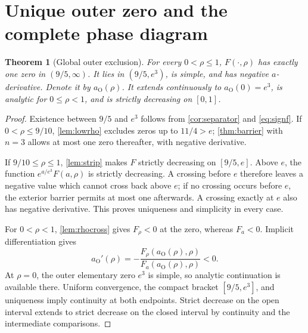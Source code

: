 \documentclass[11pt]{article}
\numberwithin{equation}{section}
\newtheorem{theorem}{Theorem}[section]
\theoremstyle{definition}
\newcommand{\aO}{a_{\mathrm O}}
\begin{document}
\section{Unique outer zero and the complete phase diagram}
\label{sec:phase}

\begin{theorem}[Global outer exclusion]\label{thm:outer}
For every $0<\rho\leq1$, $F(\cdot,\rho)$ has exactly one zero in
$(9/5,\infty)$. It lies in $(9/5,e^3)$, is simple, and has negative
$a$-derivative. Denote it by $\aO(\rho)$.
It extends continuously to $\aO(0)=e^3$, is analytic for $0\leq\rho<1$,
and is strictly decreasing on $[0,1]$.
\end{theorem}
\begin{proof}
Existence between $9/5$ and $e^3$ follows from \cref{cor:separator} and
\eqref{eq:signf}. If $0<\rho\leq9/10$, \cref{lem:lowrho} excludes zeros
up to $11/4>e$; \cref{thm:barrier} with $n=3$ allows at most one zero
thereafter, with negative derivative.

If $9/10\leq\rho\leq1$, \cref{lem:strip} makes $F$ strictly decreasing
on $[9/5,e]$. Above $e$, the function $e^{a/e^3}F(a,\rho)$ is strictly
decreasing. A crossing before $e$ therefore leaves a negative value
which cannot cross back above $e$; if no crossing occurs before $e$,
the exterior barrier permits at most one afterwards. A crossing exactly
at $e$ also has negative derivative. This proves uniqueness and simplicity
in every case.

For $0<\rho<1$, \cref{lem:rhocross} gives $F_\rho<0$ at the zero,
whereas $F_a<0$. Implicit differentiation gives
\begin{equation}\label{eq:outervelocity}
 \aO'(\rho)=-\frac{F_\rho(\aO(\rho),\rho)}{F_a(\aO(\rho),\rho)}<0.
\end{equation}
At $\rho=0$, the outer elementary zero $e^3$ is simple, so analytic
continuation is available there. Uniform convergence, the compact
bracket $[9/5,e^3]$, and uniqueness imply continuity at both endpoints.
Strict decrease on the open interval extends to strict decrease on the
closed interval by continuity and the intermediate comparisons.
\end{proof}
\end{document}
